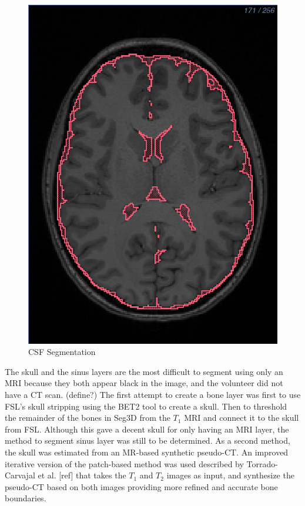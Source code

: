 \begin{figure}[H]
\begin{center}
\includegraphics[width=.49\textwidth]{Figures/CSF_seg}
\caption{CSF Segmentation}
\label{fig:csf}
\end{center}
\end{figure}

The skull and the sinus layers are the most difficult to segment using only an MRI because they both appear black in the image, and the volunteer did not have a CT scan. (define?) The first attempt to create a bone layer was first to use FSL's skull stripping using the BET2 tool to create a skull. Then to threshold the remainder of the bones in Seg3D from the $T_1$ MRI and connect it to the skull from FSL. Although this gave a decent skull for only having an MRI layer, the method to segment sinus layer was still to be determined. As a second method, the skull was estimated from an MR-based synthetic pseudo-CT. An improved iterative version of the patch-based method was used described by Torrado-Carvajal et al. [ref] that takes the $T_1$ and $T_2$ images as input, and synthesize the pseudo-CT based on both images providing more refined and accurate bone boundaries. 

